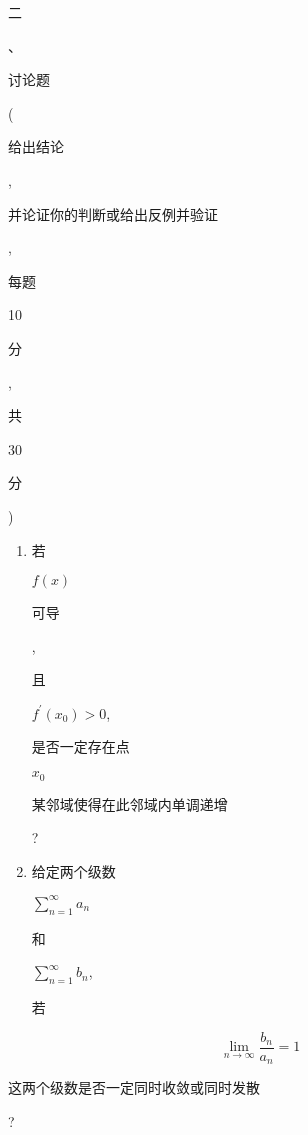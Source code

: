 \documentclass[10pt]{article}
\begin{document}
\begin{CJK}{UTF8}{mj}二\end{CJK}、\begin{CJK}{UTF8}{mj}讨论题\end{CJK} (\begin{CJK}{UTF8}{mj}给出结论\end{CJK}, \begin{CJK}{UTF8}{mj}并论证你的判断或给出反例并验证\end{CJK}, \begin{CJK}{UTF8}{mj}每题\end{CJK} 10 \begin{CJK}{UTF8}{mj}分\end{CJK}, \begin{CJK}{UTF8}{mj}共\end{CJK} 30 \begin{CJK}{UTF8}{mj}分\end{CJK})

\begin{enumerate}
  \item \begin{CJK}{UTF8}{mj}若\end{CJK} $f(x)$ \begin{CJK}{UTF8}{mj}可导\end{CJK}, \begin{CJK}{UTF8}{mj}且\end{CJK} $f^{\prime}\left(x_{0}\right)>0$, \begin{CJK}{UTF8}{mj}是否一定存在点\end{CJK} $x_{0}$ \begin{CJK}{UTF8}{mj}某邻域使得在此邻域内单调递增\end{CJK}?

  \item \begin{CJK}{UTF8}{mj}给定两个级数\end{CJK} $\sum_{n=1}^{\infty} a_{n}$ \begin{CJK}{UTF8}{mj}和\end{CJK} $\sum_{n=1}^{\infty} b_{n}$, \begin{CJK}{UTF8}{mj}若\end{CJK}

\end{enumerate}
$$
\lim _{n \rightarrow \infty} \frac{b_{n}}{a_{n}}=1
$$
\begin{CJK}{UTF8}{mj}这两个级数是否一定同时收敛或同时发散\end{CJK}?
\end{document}

